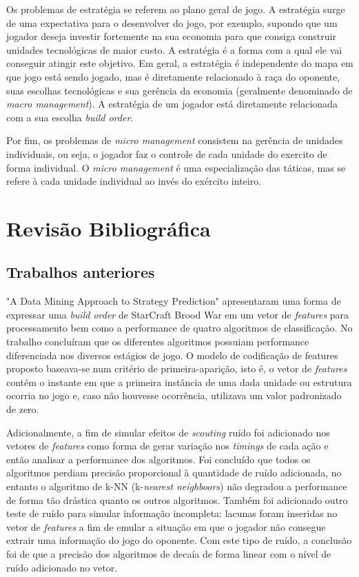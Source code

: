 Os problemas de estratégia se referem ao plano geral de jogo. A estratégia surge de uma expectativa para o desenvolver do jogo, por exemplo, supondo que um jogador deseja investir fortemente na sua economia para que consiga construir unidades tecnológicas de maior custo. A estratégia é a forma com a qual ele vai conseguir atingir este objetivo. Em geral, a estratégia é independente do mapa em que jogo está sendo jogado, mas é diretamente relacionado à raça do oponente, suas escolhas tecnológicas e sua gerência da economia (geralmente denominado de \textit{macro management}). A estratégia de um jogador está diretamente relacionada com a sua escolha \textit{build order}.

Por fim, os problemas de \textit{micro management} consistem na gerência de unidades individuais, ou seja, o jogador faz o controle de cada unidade do exercito de forma individual. O  \textit{micro management} é uma especialização das táticas, mas se refere à cada unidade individual ao invés do exército inteiro.

	\chapter{Revisão Bibliográfica}
		\section{Trabalhos anteriores}
"A Data Mining Approach to Strategy Prediction" \cite{weber2009data} apresentaram uma forma de expressar uma \textit{build order} de StarCraft Brood War em um vetor de \textit{features} para processamento bem como a performance de quatro algoritmos de classificação. No trabalho concluíram que os diferentes algoritmos possuiam performance diferenciada nos diversos estágios de jogo. O modelo de codificação de features proposto baseava-se num critério de primeira-aparição, isto é, o vetor de \textit{features} contém o instante em que a primeira instância de uma dada unidade ou estrutura ocorria no jogo e, caso não houvesse ocorrência, utilizava um valor padronizado de zero.

Adicionalmente, a fim de simular efeitos de \textit{scouting} ruído foi adicionado nos vetores de \textit{features} como forma de gerar variação nos \textit{timings} de cada ação e então analisar a performance dos algoritmos. Foi concluído que todos os algoritmos perdiam precisão proporcional à quantidade de ruído adicionada, no entanto o algoritmo de k-NN (k-\textit{nearest neighboors}) não degradou a performance de forma tão drástica quanto os outros algoritmos. Também foi adicionado outro teste de ruído para simular informação incompleta: lacunas foram inseridas no vetor de \textit{features} a fim de emular a situação em que o jogador não consegue extrair uma informação do jogo do oponente. Com este tipo de ruído, a conclusão foi de que a precisão dos algoritmos de decaía de forma linear com o nível de ruído adicionado no vetor.

